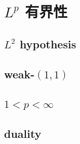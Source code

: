 \section{\texorpdfstring{\(L^p\)}{Lᵖ} 有界性}
\label{b2:sec:1804}


\subsection{\texorpdfstring{\(L^2\)}{L2} hypothesis}
\label{b2:subsec:180401}

\subsection{weak-\texorpdfstring{\((1,1)\)}{(1,1)}}
\label{b2:subsec:180402}

\subsection{\texorpdfstring{\(1<p<\infty\)}{1<p<∞}}
\label{b2:subsec:180403}

\subsection{duality}
\label{b2:subsec:180404}


